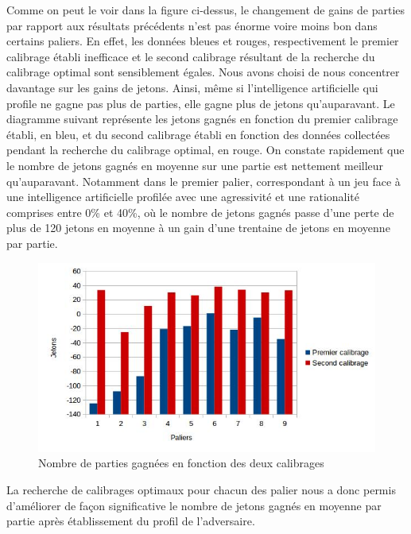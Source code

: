 \documentclass{report}
\begin{document}
Comme on peut le voir dans la figure ci-dessus, le changement de gains de parties par rapport aux résultats précédents n'est pas énorme voire moins bon dans certains paliers. En effet, les données bleues et rouges, respectivement le premier calibrage établi inefficace et le second calibrage résultant de la recherche du calibrage optimal sont sensiblement égales. Nous avons choisi de nous concentrer davantage sur les gains de jetons. Ainsi, même si l'intelligence artificielle qui profile ne gagne pas plus de parties, elle gagne plus de jetons qu’auparavant. Le diagramme suivant représente les jetons gagnés en fonction du premier calibrage établi, en bleu, et du second calibrage établi en fonction des données collectées pendant la recherche du calibrage optimal, en rouge. On constate rapidement que le nombre de jetons gagnés en moyenne sur une partie est nettement meilleur qu'auparavant. Notamment dans le premier palier, correspondant à un jeu face à une intelligence artificielle profilée avec une agressivité et une rationalité comprises entre 0\% et 40\%, où le nombre de jetons gagnés passe d'une perte de plus de 120 jetons en moyenne à un gain d'une trentaine de jetons en moyenne par partie. \\

\begin{figure}[H]
	\begin{center}
		\includegraphics[scale=0.5]{./imagesRapport/JetonsGagnesEnFonctionCalibrage.jpg}
	\end{center}
	\caption{Nombre de parties gagnées en fonction des deux calibrages}
\end{figure}

La recherche de calibrages optimaux pour chacun des palier nous a donc permis d'améliorer de façon significative le nombre de jetons gagnés en moyenne par partie après établissement du profil de l'adversaire.
\end{document}
